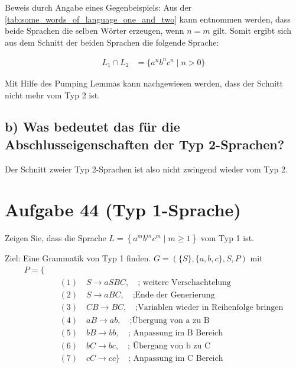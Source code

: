 \documentclass{article}
\begin{document}
Beweis durch Angabe eines Gegenbeispiels: Aus der \autoref{tab:some_words_of_language_one_and_two} kann entnommen werden, dass beide Sprachen die selben Wörter erzeugen, wenn $n=m$ gilt. Somit ergibt sich aus dem Schnitt der beiden Sprachen die folgende Sprache:

\begin{align}
L_1 \cap L_2 &= \{a^n b^n c^n \mid n > 0\} \nonumber
\end{align}

Mit Hilfe des Pumping Lemmas kann nachgewiesen werden, dass der Schnitt nicht mehr vom Typ 2 ist.

\subsection*{b) Was bedeutet das für die Abschlusseigenschaften der Typ 2-Sprachen?}

Der Schnitt zweier Typ 2-Sprachen ist also nicht zwingend wieder vom Typ 2.


\section*{Aufgabe 44 (Typ 1-Sprache)}

Zeigen Sie, dass die Sprache $L = \left\{a^m b^m c^m \mid m \geq 1\right\}$ vom Typ 1 ist.

Ziel: Eine Grammatik von Typ 1 finden.
$G = (\{S\}, \{a, b, c\}, S, P)$ mit
\begin{equation}
\begin{split}
P = \{ \\\
&\quad (1) \quad S \rightarrow aSBC, \quad \text{; weitere Verschachtelung} \\\ 
&\quad (2) \quad S \rightarrow aBC, \quad \text{;Ende der Generierung} \\\
&\quad (3) \quad CB \rightarrow BC, \quad \text{;Variablen wieder in Reihenfolge bringen} \\\
&\quad (4) \quad aB \rightarrow ab, \quad \text{;Übergung von a zu B} \\\
&\quad (5) \quad bB \rightarrow bb, \quad \text{; Anpassung im B Bereich} \\\
&\quad (6) \quad bC \rightarrow bc, \quad \text{; Übergang von b zu C} \\\
&\quad (7) \quad cC \rightarrow cc \} \quad \text{; Anpassung im C Bereich} \\\
\end{split}
\end{equation}
\end{document}
